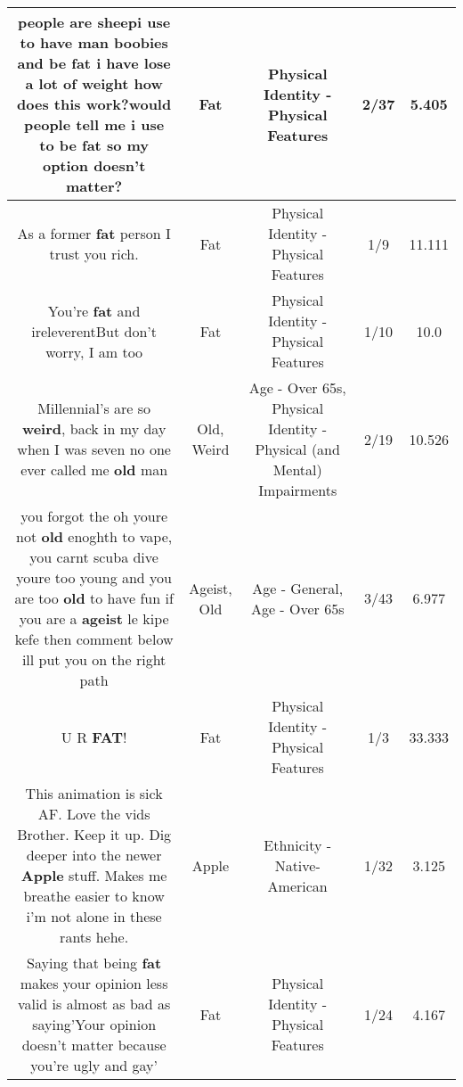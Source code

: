\documentclass[11pt]{article}
\newlength\mylength
\begin{document}
\begin{center}
\begin{longtable}{|C{.65\mylength}|C{.30\mylength}|C{.12\mylength}|C{.12\mylength}|C{.12\mylength}|}
  \small people are sheepi use to have man boobies and be \textbf{fat} i have lose a lot of weight how does this work?would people tell me i use to be \textbf{fat} so my option doesn't matter?\normalsize   & Fat & Physical Identity - Physical Features & 2/37 & 5.405 \\  \hline
  \small As a former \textbf{fat} person I trust you rich.\normalsize   & Fat & Physical Identity - Physical Features & 1/9 & 11.111 \\  \hline
  \small You're \textbf{fat} and ireleverentBut don't worry, I am too\normalsize   & Fat & Physical Identity - Physical Features & 1/10 & 10.0 \\  \hline
  \small Millennial's are so \textbf{weird}, back in my day when I was seven no one ever called me \textbf{old} man\normalsize   & Old, Weird & Age - Over 65s, Physical Identity - Physical (and Mental) Impairments & 2/19 & 10.526 \\  \hline
  \small you forgot the oh youre not \textbf{old} enoghth to vape, you carnt scuba dive youre too young and you are too \textbf{old} to have fun if you are a \textbf{ageist} le kipe kefe then comment below ill put you on the right path\normalsize   & Ageist, Old & Age - General, Age - Over 65s & 3/43 & 6.977 \\  \hline
  \small U R \textbf{FAT}!\normalsize   & Fat & Physical Identity - Physical Features & 1/3 & 33.333 \\  \hline
  \small This animation is sick AF. Love the vids Brother. Keep it up. Dig deeper into the newer \textbf{Apple} stuff. Makes me breathe easier to know i'm not alone in  these rants hehe.\normalsize   & Apple & Ethnicity - Native-American & 1/32 & 3.125 \\  \hline
  \small Saying that being \textbf{fat} makes your opinion less valid is almost as bad as saying'Your opinion doesn't matter because you're ugly and gay'\normalsize   & Fat & Physical Identity - Physical Features & 1/24 & 4.167 \\  \hline

\end{longtable}
\end{center}
\end{document}
